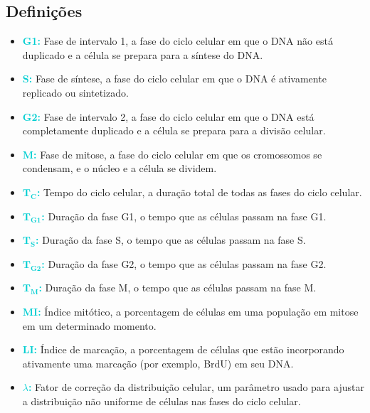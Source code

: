 \documentclass[11pt,a4paper]{article}
\newcounter{exemplo}
\begin{document}
\subsection*{Definições}

	\begin{itemize}
		\item \textcolor{DarkTurquoise}{\textbf{G1:}} Fase de intervalo 1, a fase do ciclo celular em que o DNA não está duplicado e a célula se prepara para a síntese do DNA.
		\item \textcolor{DarkTurquoise}{\textbf{S:}} Fase de síntese, a fase do ciclo celular em que o DNA é ativamente replicado ou sintetizado.
		\item \textcolor{DarkTurquoise}{\textbf{G2:}} Fase de intervalo 2, a fase do ciclo celular em que o DNA está completamente duplicado e a célula se prepara para a divisão celular.
		\item \textcolor{DarkTurquoise}{\textbf{M:}} Fase de mitose, a fase do ciclo celular em que os cromossomos se condensam, e o núcleo e a célula se dividem.
		\item \textcolor{DarkTurquoise}{\textbf{$\mathbf{\text{T}_\text{C}}$:}} Tempo do ciclo celular, a duração total de todas as fases do ciclo celular.
		\item \textcolor{DarkTurquoise}{\textbf{$\mathbf{\text{T}_\text{G1}}$:}} Duração da fase G1, o tempo que as células passam na fase G1.
		\item \textcolor{DarkTurquoise}{\textbf{$\mathbf{\text{T}_\text{S}}$:}} Duração da fase S, o tempo que as células passam na fase S.
		\item \textcolor{DarkTurquoise}{\textbf{$\mathbf{\text{T}_\text{G2}}$:}} Duração da fase G2, o tempo que as células passam na fase G2.
		\item \textcolor{DarkTurquoise}{\textbf{$\mathbf{\text{T}_\text{M}}$:}} Duração da fase M, o tempo que as células passam na fase M.
		\item \textcolor{DarkTurquoise}{\textbf{MI:}} Índice mitótico, a porcentagem de células em uma população em mitose em um determinado momento.
		\item \textcolor{DarkTurquoise}{\textbf{LI:}} Índice de marcação, a porcentagem de células que estão incorporando ativamente uma marcação (por exemplo, BrdU) em seu DNA.
		\item \textcolor{DarkTurquoise}{\textbf{$\lambda$:}} Fator de correção da distribuição celular, um parâmetro usado para ajustar a distribuição não uniforme de células nas fases do ciclo celular.

\end{itemize}
\end{document}

